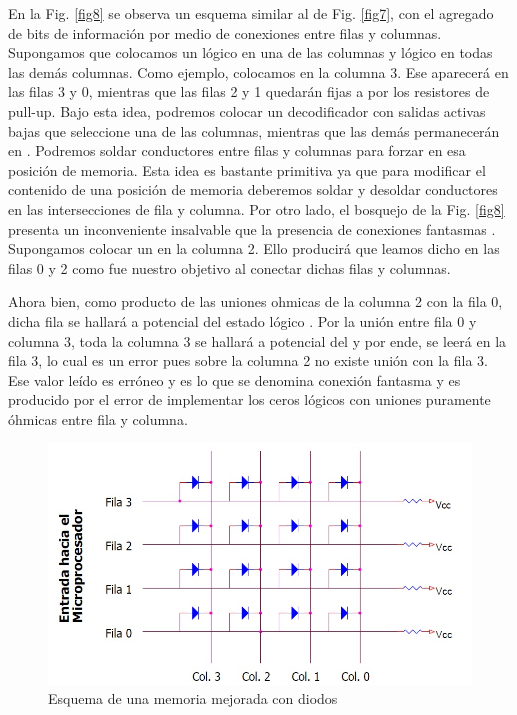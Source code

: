 \documentclass[12pt]{book}
\theoremstyle{definition}
\theoremstyle{remark}
\theoremstyle{plain}
\begin{document}
En la Fig. \ref{fig8} se observa un esquema similar al de Fig. \ref{fig7}, con el agregado de bits de información por medio de conexiones entre filas y columnas.
Supongamos que colocamos un  \grqq lógico en una de las columnas y  \grqq  lógico en todas las demás columnas. Como ejemplo, colocamos  \grqq en la columna 3. Ese \grqq aparecerá en las filas 3 y 0, mientras que las filas 2 y 1 quedarán fijas a  \grqq por los resistores de pull-up.
Bajo esta idea, podremos colocar un decodificador con salidas activas bajas que seleccione una de las columnas, mientras que las demás permanecerán en  \grqq . Podremos \grqq soldar \grqq conductores entre filas y columnas para forzar  \grqq en esa posición de memoria.
Esta idea es bastante primitiva ya que para modificar el contenido de una posición de memoria deberemos \grqq soldar \grqq y \grqq desoldar \grqq conductores en las intersecciones de fila y columna.
Por otro lado, el bosquejo de la Fig. \ref{fig8} presenta un inconveniente insalvable que la presencia de conexiones \grqq fantasmas \grqq . Supongamos colocar un  \grqq en la columna 2. Ello producirá que leamos dicho  \grqq en las filas 0 y 2 como fue nuestro objetivo al conectar dichas filas y columnas.

Ahora bien, como producto de las uniones ohmicas de la columna 2 con la fila 0, dicha fila se hallará a potencial del estado lógico  \grqq. Por la unión entre fila 0 y columna 3, toda la columna 3 se hallará a potencial del  \grqq y por ende, se leerá  \grqq en la fila 3, lo cual es un error pues sobre la columna 2 no existe unión con la fila 3. Ese valor leído es erróneo y es lo que se denomina conexión fantasma y es producido por el error de implementar los ceros lógicos con uniones puramente óhmicas entre fila y columna.

\begin{figure}
\centering
\includegraphics[width=5in]{entrada3.jpg}
\caption{Esquema de una memoria mejorada con diodos}
\label{fig9}
\end{figure}
\end{document}

